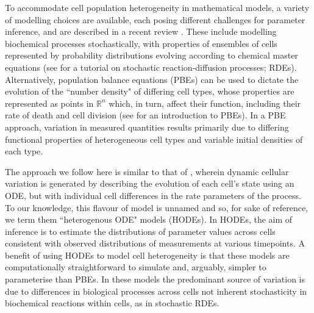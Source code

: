 To accommodate cell population heterogeneity in mathematical models, a variety of modelling choices are available, each posing different challenges for parameter inference, and are described in a recent review \cite{waldherr2018estimation}. These include modelling biochemical processes stochastically, with properties of ensembles of cells represented by probability distributions evolving according to chemical master equations (see \cite{erban2007practical} for a tutorial on stochastic reaction-diffusion processes; RDEs). Alternatively, population balance equations (PBEs) can be used to dictate the evolution of the ``number density" of differing cell types, whose properties are represented as points in $\mathbb{R}^n$ which, in turn, affect their function, including their rate of death and cell division (see \cite{ramkrishna2014population} for an introduction to PBEs). In a PBE approach, variation in measured quantities results primarily due to differing functional properties of heterogeneous cell types and variable initial densities of each type.

The approach we follow here is similar to that of \cite{dixit2018maximum}, wherein dynamic cellular variation is generated by describing the evolution of each cell's state using an ODE, but with individual cell differences in the rate parameters of the process. To our knowledge, this flavour of model is unnamed and so, for sake of reference, we term them ``heterogenous ODE" models (HODEs). In HODEs, the aim of inference is to estimate the distributions of parameter values across cells consistent with observed distributions of measurements at various timepoints. A benefit of using HODEs to model cell heterogeneity is that these models are computationally straightforward to simulate and, arguably, simpler to parameterise than PBEs. In these models the predominant source of variation is due to differences in biological processes across cells not inherent stochasticity in biochemical reactions within cells, as in stochastic RDEs.

